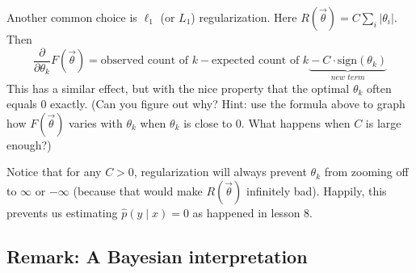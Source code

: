 \documentclass[11pt]{article}
\newcommand{\vtheta}{\vec{\theta}}
\newcommand{\ph}{\hat{p}}
\newcommand{\diffk}{\frac{\partial}{\partial \theta_k}}
\begin{document}
Another common choice is $\ell_1$ (or $L_1$) regularization.  Here 
$R(\vtheta) = C \sum_i |\theta_i|$.  Then
\begin{equation}
  \diffk F(\vtheta) = \textrm{observed count of $k$} -
  \textrm{expected count of $k$} \underbrace{\mbox{}-C\cdot \textrm{sign}(\theta_k)}_{\textit{new term}}
\end{equation}
This has a similar effect, but with the nice property that the optimal
$\theta_k$ often equals 0 exactly.  (Can you figure out why?  Hint:
use the formula above to graph how $F(\vtheta)$ varies with $\theta_k$ when
$\theta_k$ is close to 0.  What happens when $C$ is large enough?)

Notice that for any $C > 0$, regularization will always prevent
$\theta_k$ from zooming off to $\infty$ or $-\infty$ (because that
would make $R(\vtheta)$ infinitely bad).  Happily, this prevents us
estimating $\ph(y\mid x)=0$ as happened in lesson 8.

\subsection{Remark: A Bayesian interpretation}
\end{document}
